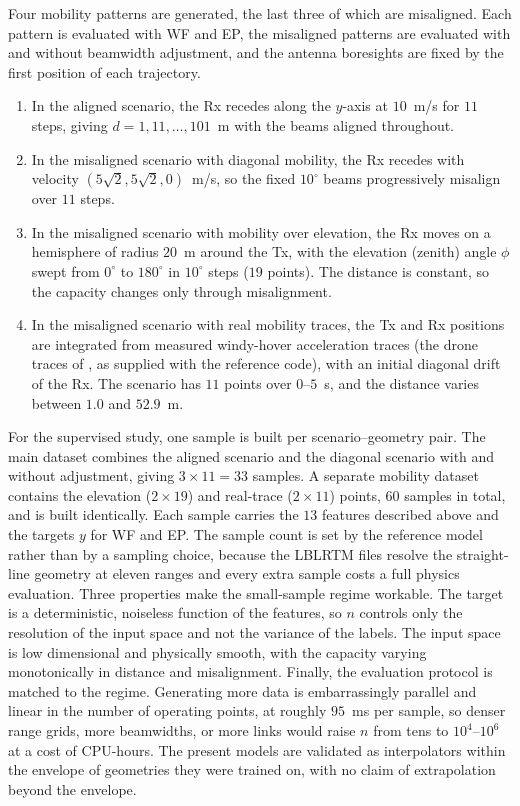 \documentclass{ieee-ojvt}
\newcommand{\PLMASTEP}{$95$~ms}       %
\begin{document}
Four mobility patterns are generated, the last three of which are misaligned. Each
pattern is evaluated with WF and EP, the misaligned patterns are evaluated with and
without beamwidth adjustment, and the antenna boresights are fixed by the first position
of each trajectory.
\begin{enumerate}
\def\labelenumi{\arabic{enumi})}
\item In the aligned scenario, the Rx recedes along the $y$-axis at $10$~m/s for $11$
steps, giving $d=1,11,\dots,101$~m with the beams aligned throughout.
\item In the misaligned scenario with diagonal mobility, the Rx recedes with velocity
$(5\sqrt2,5\sqrt2,0)$~m/s, so the fixed $10^\circ$ beams progressively misalign over
$11$ steps.
\item In the misaligned scenario with mobility over elevation, the Rx moves on a
hemisphere of radius $20$~m around the Tx, with the elevation (zenith) angle $\phi$ swept
from $0^\circ$ to $180^\circ$ in $10^\circ$ steps ($19$ points). The distance is
constant, so the capacity changes only through misalignment.
\item In the misaligned scenario with real mobility traces, the Tx and Rx positions are
integrated from measured windy-hover acceleration traces (the drone traces of
\cite{moorthy2022beam}, as supplied with the reference code), with an initial diagonal
drift of the Rx. The scenario has $11$ points over $0$--$5$~s, and the distance varies
between $1.0$ and $52.9$~m.
\end{enumerate}

For the supervised study, one sample is built per scenario--geometry pair. The main
dataset combines the aligned scenario and the diagonal scenario with and without
adjustment, giving $3\times11=33$ samples. A separate mobility dataset contains the
elevation ($2\times19$) and real-trace ($2\times11$) points, $60$ samples in total, and is
built identically. Each sample carries the $13$ features described above and the targets
$y$ for WF and EP. The sample count is set by the reference model rather than by a
sampling choice, because the LBLRTM files resolve the straight-line geometry at eleven
ranges and every extra sample costs a full physics evaluation. Three properties make the
small-sample regime workable. The target is a deterministic, noiseless function of the
features, so $n$ controls only the resolution of the input space and not the variance of
the labels. The input space is low dimensional and physically smooth, with the capacity
varying monotonically in distance and misalignment. Finally, the evaluation protocol is
matched to the regime. Generating more data is embarrassingly parallel and linear in the
number of operating points, at roughly \PLMASTEP{} per sample, so denser range grids,
more beamwidths, or more links would raise $n$ from tens to $10^4$--$10^6$ at a cost of
CPU-hours. The present models are validated as interpolators within the envelope of
geometries they were trained on, with no claim of extrapolation beyond the envelope.
\end{document}
